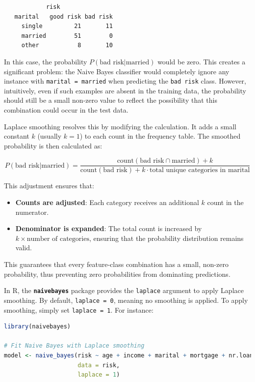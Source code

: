\documentclass[
]{book}
\newcommand{\passthrough}[1]{#1}
\providecommand{\tightlist}{%
  \setlength{\itemsep}{0pt}\setlength{\parskip}{0pt}}
\theoremstyle{definition}
\theoremstyle{definition}
\theoremstyle{definition}
\theoremstyle{definition}
\theoremstyle{remark}
\begin{document}
\begin{lstlisting}
            risk
   marital   good risk bad risk
     single         21       11
     married        51        0
     other           8       10
\end{lstlisting}

In this case, the probability \(P(\text{bad risk} | \text{married})\) would be zero. This creates a significant problem: the Naive Bayes classifier would completely ignore any instance with \passthrough{\lstinline!marital = married!} when predicting the \passthrough{\lstinline!bad risk!} class. However, intuitively, even if such examples are absent in the training data, the probability should still be a small non-zero value to reflect the possibility that this combination could occur in the test data.

Laplace smoothing resolves this by modifying the calculation. It adds a small constant \(k\) (usually \(k = 1\)) to each count in the frequency table. The smoothed probability is then calculated as:

\[
P(\text{bad risk} | \text{married}) = \frac{\text{count}(\text{bad risk} \cap \text{married}) + k}{\text{count}(\text{bad risk}) + k \cdot \text{total unique categories in } \text{marital}}
\]

This adjustment ensures that:

\begin{itemize}
\tightlist
\item
  \textbf{Counts are adjusted}: Each category receives an additional \(k\) count in the numerator.
\item
  \textbf{Denominator is expanded}: The total count is increased by \(k \times \text{number of categories}\), ensuring that the probability distribution remains valid.
\end{itemize}

This guarantees that every feature-class combination has a small, non-zero probability, thus preventing zero probabilities from dominating predictions.

In R, the \textbf{\passthrough{\lstinline!naivebayes!}} package provides the \passthrough{\lstinline!laplace!} argument to apply Laplace smoothing. By default, \passthrough{\lstinline!laplace = 0!}, meaning no smoothing is applied. To apply smoothing, simply set \passthrough{\lstinline!laplace = 1!}. For instance:

\begin{lstlisting}[language=R]
library(naivebayes)

# Fit Naive Bayes with Laplace smoothing
model <- naive_bayes(risk ~ age + income + marital + mortgage + nr.loans, 
                     data = risk, 
                     laplace = 1)
\end{lstlisting}
\end{document}
